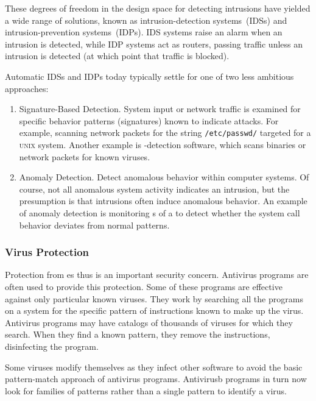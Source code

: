 These degrees of freedom in the design space for detecting intrusions have yielded a wide range of solutions, known as intrusion-detection systems~(IDSs) and intrusion-prevention systems~(IDPs).
IDS systems raise an alarm when an intrusion is detected, while IDP systems act as routers, passing traffic unless an intrusion is detected (at which point that traffic is blocked).

Automatic IDSs and IDPs today typically settle for one of two less ambitious approaches:
\begin{enumerate}[noitemsep]
\item Signature-Based Detection.
  System input or network traffic is examined for specific behavior patterns (signatures) known to indicate attacks.
  For example, scanning network packets for the string \texttt{/etc/passwd/} targeted for a \textsc{unix} system.
  Another example is -detection software, which scans binaries or network packets for known viruses.
\item Anomaly Detection.
  Detect anomalous behavior within computer systems.
  Of course, not all anomalous system activity indicates an intrusion, but the presumption is that intrusions often induce anomalous behavior.
  An example of anomaly detection is monitoring s of a   to detect whether the system call behavior deviates from normal patterns.
\end{enumerate}

\subsubsection{Virus Protection}\label{subsubsec:Virus_Protection}
Protection from es thus is an important security concern.
Antivirus programs are often used to provide this protection.
Some of these programs are effective against only particular known viruses.
They work by searching all the programs on a system for the specific pattern of instructions known to make up the virus.
Antivirus programs may have catalogs of thousands of viruses for which they search.
When they find a known pattern, they remove the instructions, disinfecting the program.

Some viruses modify themselves as they infect other software to avoid the basic pattern-match approach of antivirus programs. Antivirusb
programs in turn now look for families of patterns rather than a single pattern to identify a virus.


